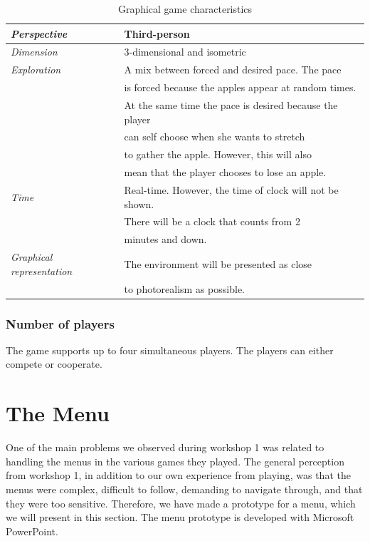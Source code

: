 \begin{table} [H]
\centering
    \begin{tabular}{|l|l|}
       \hline
      \emph {Perspective} & Third-person \\ \hline
       \emph{Dimension} &  3-dimensional and isometric \\ \hline
	       \emph{Exploration} &  A mix between forced and desired pace. The pace \\ & is forced because the apples appear at random times. \\ & At the same time the pace is desired because the player \\ & can self choose when she wants to stretch \\ & to gather the apple. However, this will also \\ & mean that the player chooses to lose an apple. \\ \hline
	       \emph{Time} & Real-time. However, the time of clock will not be shown. \\ & There will be a clock that counts from 2 \\ &minutes and down. \\ \hline
	       \emph{Graphical representation} & The environment will be presented as close \\ & to photorealism as possible.  \\ \hline
    \end{tabular}
    \caption[Graphical game characteristics in the "Apple Picking" game]{Graphical game characteristics}
    \label{tab:graphical2}
\end{table}  

\subsubsection{Number of players} 
The game supports up to four simultaneous players. The players can either compete or cooperate. 

\section{The Menu}
\label{sec:menu}

One of the main problems we observed during workshop 1 was related to handling the menus in the various games they played. The general perception from workshop 1, in addition to our own experience from playing, was that the menus were complex, difficult to follow, demanding to navigate through, and that they were too sensitive. Therefore, we have made a prototype for a menu, which we will present in this section. The menu prototype is developed with Microsoft PowerPoint.

